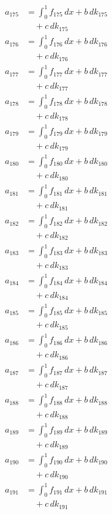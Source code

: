 \documentclass{article}
\begin{document}
\begin{align}
a_{175} &= \int_0^1 f_{175}\,dx + b\,dk_{175} \\
&\quad + c\,dk_{175} \\
a_{176} &= \int_0^1 f_{176}\,dx + b\,dk_{176} \\
&\quad + c\,dk_{176} \\
a_{177} &= \int_0^1 f_{177}\,dx + b\,dk_{177} \\
&\quad + c\,dk_{177} \\
a_{178} &= \int_0^1 f_{178}\,dx + b\,dk_{178} \\
&\quad + c\,dk_{178} \\
a_{179} &= \int_0^1 f_{179}\,dx + b\,dk_{179} \\
&\quad + c\,dk_{179} \\
a_{180} &= \int_0^1 f_{180}\,dx + b\,dk_{180} \\
&\quad + c\,dk_{180} \\
a_{181} &= \int_0^1 f_{181}\,dx + b\,dk_{181} \\
&\quad + c\,dk_{181} \\
a_{182} &= \int_0^1 f_{182}\,dx + b\,dk_{182} \\
&\quad + c\,dk_{182} \\
a_{183} &= \int_0^1 f_{183}\,dx + b\,dk_{183} \\
&\quad + c\,dk_{183} \\
a_{184} &= \int_0^1 f_{184}\,dx + b\,dk_{184} \\
&\quad + c\,dk_{184} \\
a_{185} &= \int_0^1 f_{185}\,dx + b\,dk_{185} \\
&\quad + c\,dk_{185} \\
a_{186} &= \int_0^1 f_{186}\,dx + b\,dk_{186} \\
&\quad + c\,dk_{186} \\
a_{187} &= \int_0^1 f_{187}\,dx + b\,dk_{187} \\
&\quad + c\,dk_{187} \\
a_{188} &= \int_0^1 f_{188}\,dx + b\,dk_{188} \\
&\quad + c\,dk_{188} \\
a_{189} &= \int_0^1 f_{189}\,dx + b\,dk_{189} \\
&\quad + c\,dk_{189} \\
a_{190} &= \int_0^1 f_{190}\,dx + b\,dk_{190} \\
&\quad + c\,dk_{190} \\
a_{191} &= \int_0^1 f_{191}\,dx + b\,dk_{191} \\
&\quad + c\,dk_{191} \\

\end{align}
\end{document}
